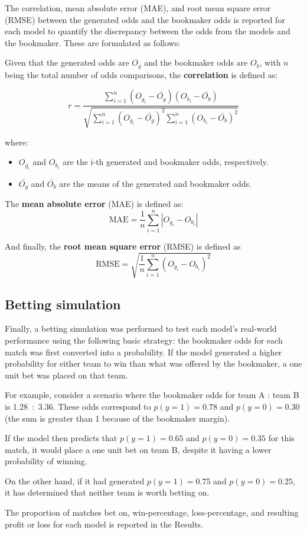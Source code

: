 The correlation, mean absolute error (MAE), and root mean square error (RMSE) between the generated odds and the bookmaker odds is reported for each model to quantify the discrepancy between the odds from the models and the bookmaker. These are formulated as follows:\label{bettingstats}

Given that the generated odds are $O_g$ and the bookmaker odds are $O_b$, with $n$ being the total number of odds comparisons, the \textbf{correlation} is defined as:

\[r = \frac{\sum_{i=1}^{n} (O_{g_i} - \bar{O_g})(O_{b_i} - \bar{O_b})}{\sqrt{\sum_{i=1}^{n} (O_{g_i} - \bar{O_g})^2 \sum_{i=1}^{n} (O_{b_i} - \bar{O_b})^2}}\]

where:
\begin{itemize}
	\item $O_{g_i}$ and $O_{b_i}$ are the i-th generated and bookmaker odds, respectively.
	\item $\bar{O_g}$ and $\bar{O_b}$ are the means of the generated and bookmaker odds.
\end{itemize}

The \textbf{mean absolute error} (MAE) is defined as:
\[\text{MAE} = \frac{1}{n} \sum_{i=1}^{n} |O_{g_i} - O_{b_i}|\]

And finally, the \textbf{root mean square error} (RMSE) is defined as
\[\text{RMSE} = \sqrt{\frac{1}{n} \sum_{i=1}^{n} (O_{g_i} - O_{b_i})^2}\]

\subsection{Betting simulation}

Finally, a betting simulation was performed to test each model's real-world performance using the following basic strategy: the bookmaker odds for each match was first converted into a probability. If the model generated a higher probability for either team to win than what was offered by the bookmaker, a one unit bet was placed on that team. 

For example, consider a scenario where the bookmaker odds for team A : team B is 1.28~:~3.36. These odds correspond to $p(y=1)=0.78$ and $p(y=0)=0.30$ (the sum is greater than 1 because of the bookmaker margin).

If the model then predicts that $p(y=1)=0.65$ and $p(y=0)=0.35$ for this match, it would place a one unit bet on team B, despite it having a lower probability of winning. 

On the other hand, if it had generated $p(y=1)=0.75$ and $p(y=0)=0.25$, it has determined that neither team is worth betting on.

The proportion of matches bet on, win-percentage, loss-percentage, and resulting profit or loss for each model is reported in the Results. 